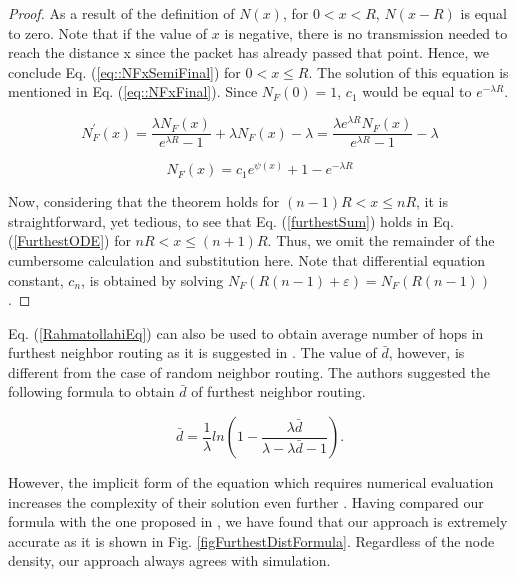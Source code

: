\documentclass[12pt, draftclsnofoot, onecolumn]{IEEEtran}
\begin{document}
\begin{proof}
As a result of the definition of $N(x)$, for $0{<}x{<}R$, $N(x-R)$ 
is equal to zero. Note that if the value of $x$ is negative, 
there is no transmission needed to reach the distance x since the packet 
has already passed that point. Hence, we conclude Eq. 
(\ref{eq::NFxSemiFinal}) for $0{<}x{\leq}R$. The solution of this equation is 
mentioned in Eq. (\ref{eq::NFxFinal}). Since $N_F(0)=1$, $c_1$ 
would be equal to $e^{-\lambda R} $.

\begin{equation}
\label{eq::NFxSemiFinal}
	N_F^{\prime}(x)= \frac{\lambda N_F(x)}{e^{\lambda R}-1} + \lambda N_F(x) - \lambda =  \frac{\lambda e^{\lambda R} N_F(x)}{e^{\lambda R}-1} - \lambda 
\end{equation}

\begin{equation}
\label{eq::NFxFinal}
	N_F(x)= c_1 e^{\psi(x)} +1 - e^{-\lambda R} 
\end{equation}


Now, considering that the theorem holds for $(n-1)R{<}x{\leq}nR$, 
it is straightforward, yet tedious, to see that Eq. (\ref{furthestSum}) holds in Eq. 
(\ref{FurthestODE}) for  $nR{<}x{\leq}(n+1)R$. Thus, we omit the remainder of the cumbersome calculation and substitution here. Note that differential equation 
constant, $c_n$, is obtained by solving $N_F(R(n-1)+\varepsilon) = N_F(R(n-1))$.
\end{proof} 

Eq. (\ref{RahmatollahiEq}) can also be used to obtain average number 
of hops in furthest neighbor routing as it is suggested in 
\cite{rahmatollahi2012closed}. The value of $\bar{d}$, however, is different 
from the case of random neighbor routing. The authors suggested the following 
formula to obtain $\bar{d}$ of furthest neighbor routing.

\begin{equation}
	\bar{d} = \frac{1}{\lambda} ln  \left( 1-\frac{\lambda \bar{d}}{\lambda - \lambda \bar{d} -1}  \right).
\end{equation}

However, the implicit form of the equation which requires numerical 
evaluation increases the complexity of their solution even further 
\cite{vural2007probability}. Having compared our formula with the one proposed in 
\cite{rahmatollahi2012closed}, we have found that our 
approach is extremely accurate as it is shown in Fig. 
\ref{figFurthestDistFormula}. Regardless of the node density, 
our approach always agrees with simulation. 
\end{document}

